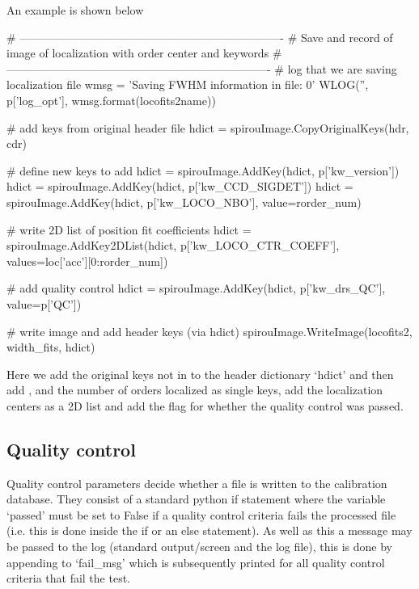 \vspace{0.5cm}
\begin{minipage}{\textwidth}
\noindent An example is shown below
\begin{pythonbox}
# ----------------------------------------------------------------------
# Save and record of image of localization with order center and keywords
# ----------------------------------------------------------------------
# log that we are saving localization file
wmsg = 'Saving FWHM information in file: {0}'
WLOG('', p['log_opt'], wmsg.format(locofits2name))

# add keys from original header file
hdict = spirouImage.CopyOriginalKeys(hdr, cdr)

# define new keys to add
hdict = spirouImage.AddKey(hdict, p['kw_version'])
hdict = spirouImage.AddKey(hdict, p['kw_CCD_SIGDET'])
hdict = spirouImage.AddKey(hdict, p['kw_LOCO_NBO'], value=rorder_num)

# write 2D list of position fit coefficients
hdict = spirouImage.AddKey2DList(hdict, p['kw_LOCO_CTR_COEFF'],
                                 values=loc['acc'][0:rorder_num])

# add quality control
hdict = spirouImage.AddKey(hdict, p['kw_drs_QC'], value=p['QC'])

# write image and add header keys (via hdict)
spirouImage.WriteImage(locofits2, width_fits, hdict)
\end{pythonbox}
\begin{note}
Here we add the original keys not in  to the header dictionary `hdict' and then add ,  and  {the number of orders localized} as single keys, add the localization centers as a 2D list and add the flag for whether the quality control was passed.
\end{note}
\end{minipage}

\clearpage
\newpage
\subsection{Quality control}
\label{ch:the_recipes:gen_layout:gen_qc}

Quality control parameters decide whether a file is written to the calibration database. They consist of a standard python if statement where the variable `passed' must be set to False if a quality control criteria fails the processed file (i.e. this is done inside the if or an else statement). As well as this a message may be passed to the log (standard output/screen and the log file), this is done by appending to `fail\_msg' which is subsequently printed for all quality control criteria that fail the test.

